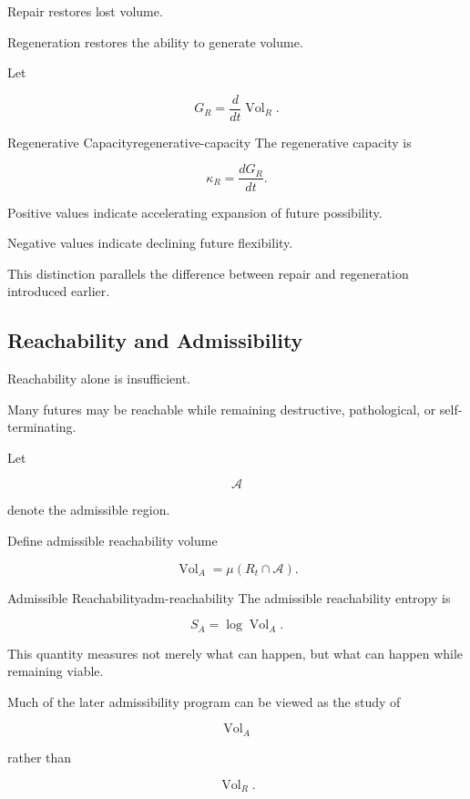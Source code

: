 \documentclass[12pt,twoside,openright]{book}
\newcommand{\Vol}{\operatorname{Vol}}
\begin{document}
Repair restores lost volume.

Regeneration restores the ability to generate volume.

Let

\[
G_R
=

\frac{d}{dt}
\Vol_R.
\]

\begin{definition}{Regenerative Capacity}{regenerative-capacity}
The regenerative capacity is

\[
\kappa_R
=

\frac{dG_R}{dt}.
\]
\end{definition}

Positive values indicate accelerating expansion of future
possibility.

Negative values indicate declining future flexibility.

This distinction parallels the difference between repair
and regeneration introduced earlier.

\subsection{Reachability and Admissibility}

Reachability alone is insufficient.

Many futures may be reachable while remaining destructive,
pathological, or self-terminating.

Let

\[
\mathcal A
\]

denote the admissible region.

Define admissible reachability volume

\[
\Vol_A
=

\mu(R_t\cap\mathcal A).
\]

\begin{definition}{Admissible Reachability}{adm-reachability}
The admissible reachability entropy is

\[
S_A
=

\log\Vol_A.
\]
\end{definition}

This quantity measures not merely what can happen, but
what can happen while remaining viable.

Much of the later admissibility program can be viewed as
the study of

\[
\Vol_A
\]

rather than

\[
\Vol_R.
\]
\end{document}
